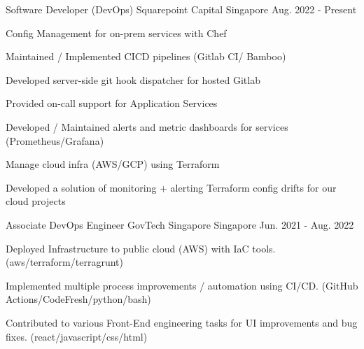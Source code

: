 

\begin{cventries}

  \cventry
    {Software Developer (DevOps)} %
    {Squarepoint Capital} %
    {Singapore} %
    {Aug. 2022 - Present} %
    {
      \begin{cvitems} %
        \item {Config Management for on-prem services with Chef}
        \item {Maintained / Implemented CICD pipelines (Gitlab CI/ Bamboo)}
        \item {Developed server-side git hook dispatcher for hosted Gitlab}
        \item {Provided on-call support for Application Services}
        \item {Developed / Maintained alerts and metric dashboards for services (Prometheus/Grafana)}
        \item {Manage cloud infra (AWS/GCP) using Terraform}
        \item {Developed a solution of monitoring + alerting Terraform config drifts for our cloud projects}
      \end{cvitems}
    }

  \cventry
    {Associate DevOps Engineer} %
    {GovTech Singapore} %
    {Singapore} %
    {Jun. 2021 - Aug. 2022} %
    {
      \begin{cvitems} %
        \item {Deployed Infrastructure to public cloud (AWS) with IaC tools. (aws/terraform/terragrunt)}
        \item {Implemented multiple process improvements / automation using CI/CD. (GitHub Actions/CodeFresh/python/bash)}
        \item {Contributed to various Front-End engineering tasks for UI improvements and bug fixes. (react/javascript/css/html)}
      \end{cvitems}
    }


\end{cventries}
